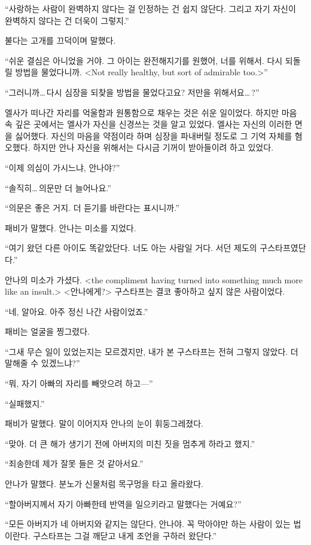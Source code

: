 ``사랑하는 사람이 완벽하지 않다는 걸 인정하는 건 쉽지 않단다. 그리고 자기 자신이 완벽하지 않다는 건 더욱이 그렇지.''

불다는 고개를 끄덕이며 말했다.

``쉬운 결심은 아니었을 거야. 그 아이는 완전해지기를 원했어, 너를 위해서. 다시 되돌릴 방법을 물었다니까. <Not really healthy, but sort of admirable too.>''

``그러니까\ldots\,다시 심장을 되찾을 방법을 물었다고요? 저만을 위해서요\ldots\,?''

엘사가 떠나간 자리를 억울함과 원통함으로 채우는 것은 쉬운 일이었다. 하지만 마음 속 깊은 곳에서는 엘사가 자신을 신경쓰는 것을 알고 있었다. 엘사는 자신의 이러한 면을 싫어했다. 자신의 마음을 약점이라 하며 심장을 파내버릴 정도로 그 기억 자체를 혐오했다. 하지만 안나 자신을 위해서는 다시금 기꺼이 받아들이려 하고 있었다.

``이제 의심이 가시느냐, 안나야?''

``솔직히\ldots\,의문만 더 늘어나요.''

``의문은 좋은 거지. 더 듣기를 바란다는 표시니까.''

패비가 말했다. 안나는 미소를 지었다.

``여기 왔던 다른 아이도 똑같았단다. 너도 아는 사람일 거다. 서던 제도의 구스타프였단다.''

안나의 미소가 가셨다. <the compliment having turned into something much more like an insult.> <안나에게\append?> 구스타프는 결코 좋아하고 싶지 않은 사람이었다.

``네, 알아요. 아주 정신 나간 사람이었죠.''

패비는 얼굴을 찡그렸다.

``그새 무슨 일이 있었는지는 모르겠지만, 내가 본 구스타프는 전혀 그렇지 않았다. 더 말해줄 수 있겠느냐?''

``뭐, 자기 아빠의 자리를 빼앗으려 하고—''

``실패했지.''

패비가 말했다. 말이 이어지자 안나의 눈이 휘둥그레졌다.

``맞아. 더 큰 해가 생기기 전에 아버지의 미친 짓을 멈추게 하라고 했지.''

``죄송한데 제가 잘못 들은 것 같아서요.''

안나가 말했다. 분노가 신물처럼 목구멍을 타고 올라왔다.

``할아버지께서 자기 아빠한테 반역을 일으키라고 말했다는 거예요?''

``모든 아버지가 네 아버지와 같지는 않단다, 안나야. 꼭 막아야만 하는 사람이 있는 법이란다. 구스타프는 그걸 깨닫고 내게 조언을 구하러 왔단다.''

